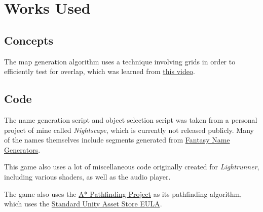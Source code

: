 \documentclass[10pt]{article}
\begin{document}



\section{Works Used}

\subsection{Concepts}

The map generation algorithm uses a technique involving grids in order to efficiently test for overlap, which was learned from
\href{https://www.youtube.com/watch?v=7WcmyxyFO7o}{this video}.

\subsection{Code}

The name generation script and object selection script was taken from a personal project of mine called \textit{Nightscape},
which is currently not released publicly. Many of the names themselves include segments generated from
\href{https://www.fantasynamegenerators.com/}{Fantasy Name Generators}.

This game also uses a lot of miscellaneous code originally created for \textit{Lightrunner}, including various shaders,
as well as the audio player.

The game also uses the \href{https://arongranberg.com/astar/}{A* Pathfinding Project} as its pathfinding algorithm,
which uses the \href{https://unity3d.com/legal/as_terms}{Standard Unity Asset Store EULA}.
\end{document}
